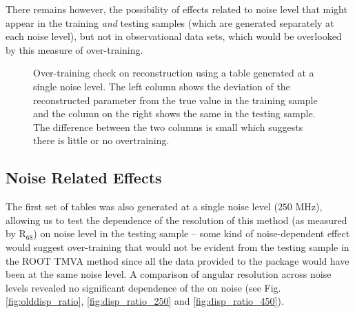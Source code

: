 \documentclass[main.tex]{subfiles}
\begin{document}
There remains however, the possibility of effects related to noise level that might appear in the training \textit{and} testing samples (which are generated separately at each noise level), but not in observational data sets, which would be overlooked by this measure of over-training.

\begin{figure}[H]
  \centering
  \caption[Over-training test.]{Over-training check on reconstruction using a \disp table generated at a single noise level. The left column shows the deviation of the reconstructed parameter from the true value in the training sample and the column on the right shows the same in the testing sample. The difference between the two columns is small which suggests there is little or no overtraining.}
  \label{fig:overtraining}
\end{figure}

\subsection{Noise Related Effects}
The first set of \disp tables was also generated at a single noise level ($250$ MHz), allowing us to test the dependence of the resolution of this method (as measured by R$_{68}$) on noise level in the testing sample -- some kind of noise-dependent effect would suggest over-training that would not be evident from the testing sample in the ROOT TMVA method since all the data provided to the package would have been at the same noise level. A comparison of angular resolution across noise levels revealed no significant dependence of the \rse on noise (see Fig. \ref{fig:olddisp_ratio}, \ref{fig:disp_ratio_250} and \ref{fig:disp_ratio_450}).
\end{document}
